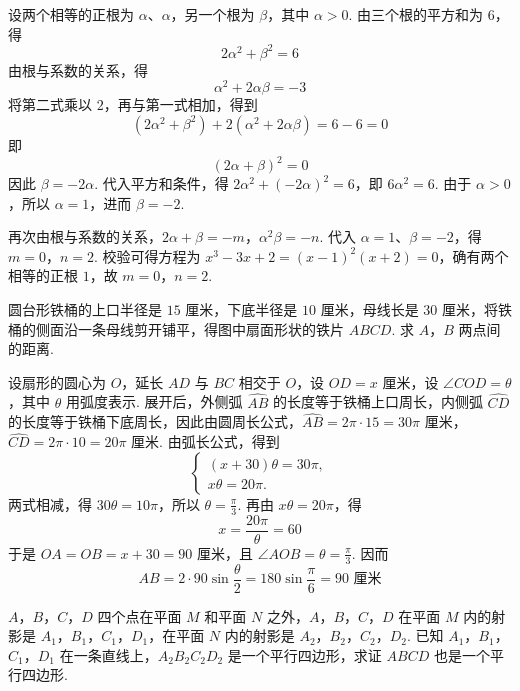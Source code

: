 \begin{solution}
设两个相等的正根为 \(\alpha\)、\(\alpha\)，另一个根为 \(\beta\)，其中 \(\alpha>0\). 由三个根的平方和为 \(6\)，得
\[
2\alpha^2+\beta^2=6
\]
由根与系数的关系，得
\[
\alpha^2+2\alpha\beta=-3
\]
将第二式乘以 \(2\)，再与第一式相加，得到
\[
\left( 2\alpha^2+\beta^2 \right)+2\left( \alpha^2+2\alpha\beta \right)=6-6=0
\]
即
\[
\left( 2\alpha+\beta \right)^2=0
\]
因此 \(\beta=-2\alpha\). 代入平方和条件，得 \(2\alpha^2+\left( -2\alpha \right)^2=6\)，即 \(6\alpha^2=6\).
由于 \(\alpha>0\)，所以 \(\alpha=1\)，进而 \(\beta=-2\).

再次由根与系数的关系，\(2\alpha+\beta=-m\)，\(\alpha^2\beta=-n\).
代入 \(\alpha=1\)、\(\beta=-2\)，得
\(m=0\)，\(n=2\).
校验可得方程为 \(x^3-3x+2=\left( x-1 \right)^2\left( x+2 \right)=0\)，确有两个相等的正根 \(1\)，故 \(m=0\)，\(n=2\).
\end{solution}

\begin{problem}
圆台形铁桶的上口半径是 \(15\text{ 厘米}\)，下底半径是 \(10\text{ 厘米}\)，母线长是 \(30\text{ 厘米}\)，将铁桶的侧面沿一条母线剪开铺平，得图中扇面形状的铁片 \(ABCD\). 求 \(A\)，\(B\) 两点间的距离.

\end{problem}

\begin{solution}
设扇形的圆心为 \(O\)，延长 \(AD\) 与 \(BC\) 相交于 \(O\)，设 \(OD=x\text{ 厘米}\)，设 \(\angle COD=\theta\)，其中 \(\theta\) 用弧度表示. 展开后，外侧弧 \(\widehat{AB}\) 的长度等于铁桶上口周长，内侧弧 \(\widehat{CD}\) 的长度等于铁桶下底周长，因此由圆周长公式，\(\widehat{AB}=2\pi\cdot15=30\pi\text{ 厘米}\)，\(\widehat{CD}=2\pi\cdot10=20\pi\text{ 厘米}\).
由弧长公式，得到
\[
\begin{cases}
\left( x+30 \right)\theta=30\pi,\\
x\theta=20\pi.
\end{cases}
\]
两式相减，得 \(30\theta=10\pi\)，所以 \(\theta=\frac{\pi}{3}\). 再由 \(x\theta=20\pi\)，得
\[
x=\frac{20\pi}{\theta}=60
\]
于是 \(OA=OB=x+30=90\text{ 厘米}\)，且 \(\angle AOB=\theta=\frac{\pi}{3}\). 因而
\[
AB=2\cdot90\sin\frac{\theta}{2}=180\sin\frac{\pi}{6}=90\text{ 厘米}
\]
\end{solution}

\begin{problem}
\(A\)，\(B\)，\(C\)，\(D\) 四个点在平面 \(M\) 和平面 \(N\) 之外，\(A\)，\(B\)，\(C\)，\(D\) 在平面 \(M\) 内的射影是 \(A_1\)，\(B_1\)，\(C_1\)，\(D_1\)，在平面 \(N\) 内的射影是 \(A_2\)，\(B_2\)，\(C_2\)，\(D_2\). 已知 \(A_1\)，\(B_1\)，\(C_1\)，\(D_1\) 在一条直线上，\(A_2B_2C_2D_2\) 是一个平行四边形，求证 \(ABCD\) 也是一个平行四边形.
\end{problem}

